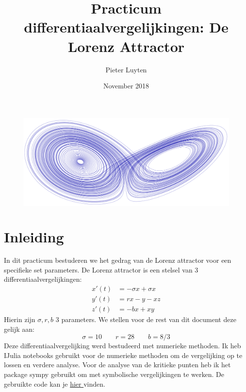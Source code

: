 \documentclass[12pt, a4paper]{article}
\title{Practicum differentiaalvergelijkingen: De Lorenz Attractor}
\author{Pieter Luyten}
\date{November 2018}
\theoremstyle{definition}
\begin{document}
\maketitle

\begin{figure}[H]
    \centering
    \includegraphics[width=0.9\linewidth]{header_verslag.png}
\end{figure}

\section{Inleiding}
In dit practicum bestuderen we het gedrag van de Lorenz attractor voor een specifieke set parameters. De Lorenz attractor is een stelsel van 3 differentiaalvergelijkingen:
\begin{align}
    x'(t) &= -\sigma x + \sigma x \nonumber \\
    y'(t) &= r x -y -xz\\
    \label{eq: stelses lorenz}
    z'(t) &= -bx +xy \nonumber
\end{align}
Hierin zijn $\sigma, r, b$ 3 parameters. We stellen voor de rest van dit document deze gelijk aan:
$$\sigma = 10 \qquad r=28 \qquad b = 8/3$$
Deze differentiaalvergelijking werd bestudeerd met numerieke methoden. Ik heb IJulia notebooks gebruikt voor de numerieke methoden om de vergelijking op te lossen en verdere analyse. Voor de analyse van de kritieke punten heb ik het package sympy gebruikt om met symbolische vergelijkingen te werken. De gebruikte code kan je \href{https://nbviewer.jupyter.org/github/Cubedsheep/practicum-diff-Julia/blob/master/practicum%20-%20Julia.ipynb?fbclid=IwAR0w5uD6396VRiiF5jM1AxzXG7EB4HG5WAsDRnNsDRpx_s_2yaZP3bjLWWA}{hier
} vinden.
\end{document}
